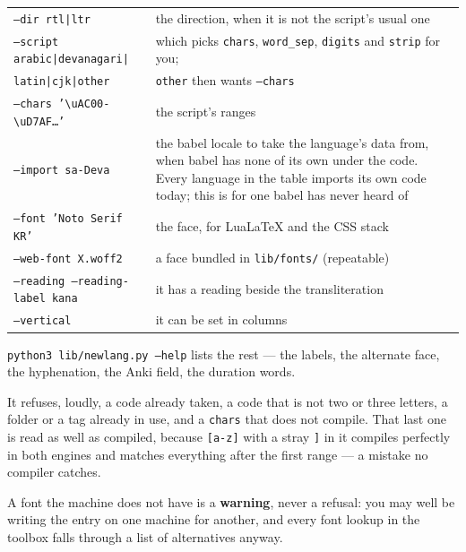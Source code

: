 \documentclass[11pt,oneside]{report}
\newcommand{\file}[1]{\texttt{#1}}
\begin{document}
\begin{center}
\begin{tabular}{@{}>{\raggedright\arraybackslash}p{}>{\raggedright\arraybackslash}p{}@{}}
\toprule
\texttt{--dir rtl|ltr} & the direction, when it is not the script's usual one \\
\addlinespace
\texttt{--script arabic|devanagari|} & which picks \texttt{chars},
  \texttt{word\_sep}, \texttt{digits} and \texttt{strip} for you; \\
\texttt{\hspace{1.2em}latin|cjk|other} & \texttt{other} then wants \texttt{--chars} \\
\addlinespace
\texttt{--chars '\textbackslash uAC00-\textbackslash uD7AF\dots'} & the script's ranges \\
\addlinespace
\texttt{--import sa-Deva} & the babel locale to take the language's data
  from, when babel has none of its own under the code. Every language in the
  table imports its own code today; this is for one babel has never heard
  of \\
\addlinespace
\texttt{--font 'Noto Serif KR'} & the face, for LuaLaTeX and the CSS stack \\
\addlinespace
\texttt{--web-font X.woff2} & a face bundled in \file{lib/fonts/} (repeatable) \\
\addlinespace
\texttt{--reading --reading-label kana} & it has a reading beside the transliteration \\
\addlinespace
\texttt{--vertical} & it can be set in columns \\
\bottomrule
\end{tabular}
\end{center}

\noindent\texttt{python3 lib/newlang.py --help} lists the rest --- the labels,
the alternate face, the hyphenation, the Anki field, the duration words.

It refuses, loudly, a code already taken, a code that is not two or three
letters, a folder or a tag already in use, and a \texttt{chars} that does not
compile. That last one is read as well as compiled, because
\texttt{[a-z]} with a stray \texttt{]} in it compiles perfectly in both
engines and matches everything after the first range --- a mistake no
compiler catches.

\begin{warnbox}
A font the machine does not have is a \textbf{warning}, never a refusal: you
may well be writing the entry on one machine for another, and every font
lookup in the toolbox falls through a list of alternatives anyway.
\end{warnbox}
\end{document}
